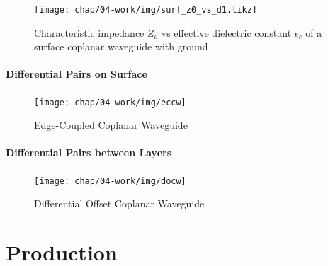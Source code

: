 \begin{figure}
		\centering
		\texttt{[image: chap/04-work/img/surf\_z0\_vs\_d1.tikz]}
		\caption{Characteristic impedance $Z_o$ vs effective dielectric constant $\epsilon_r$ of a surface coplanar waveguide with ground}
		\label{fig:surf_z0_vs_d1}
\end{figure}


 \paragraph{Differential Pairs on Surface}
\begin{figure}[!htbp]
	\centering
	\texttt{[image: chap/04-work/img/eccw]}
	\caption{Edge-Coupled Coplanar Waveguide}
	\label{fig:eccw_geometry}
\end{figure}

\paragraph{Differential Pairs between Layers}
\begin{figure}[!htbp]
	\centering
	\texttt{[image: chap/04-work/img/docw]}
	\caption{Differential Offset Coplanar Waveguide}
	\label{fig:docw}
\end{figure}






\section{Production}